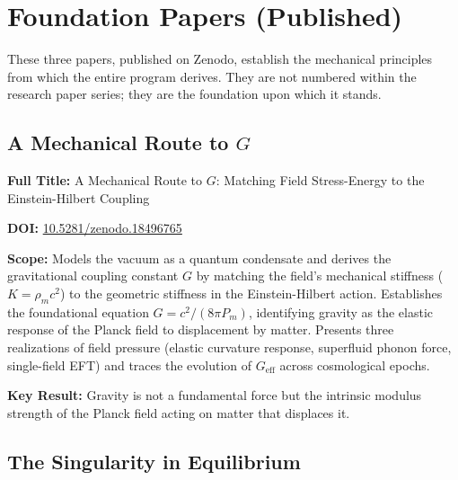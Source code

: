 \documentclass[11pt,a4paper]{article}
\begin{document}
\section{Foundation Papers (Published)}
\label{sec:foundation}

These three papers, published on Zenodo, establish the mechanical principles from which the entire program derives. They are not numbered within the research paper series; they are the foundation upon which it stands.

\subsection{A Mechanical Route to $G$}
\label{sec:foundation_G}

\textbf{Full Title:} A Mechanical Route to $G$: Matching Field Stress-Energy to the Einstein-Hilbert Coupling

\textbf{DOI:} \href{https://doi.org/10.5281/zenodo.18496765}{10.5281/zenodo.18496765}

\textbf{Scope:} Models the vacuum as a quantum condensate and derives the gravitational coupling constant $G$ by matching the field's mechanical stiffness ($K = \rho_m c^2$) to the geometric stiffness in the Einstein-Hilbert action. Establishes the foundational equation $G = c^2/(8\pi P_m)$, identifying gravity as the elastic response of the Planck field to displacement by matter. Presents three realizations of field pressure (elastic curvature response, superfluid phonon force, single-field EFT) and traces the evolution of $G_{\mathrm{eff}}$ across cosmological epochs.

\textbf{Key Result:} Gravity is not a fundamental force but the intrinsic modulus strength of the Planck field acting on matter that displaces it.

\subsection{The Singularity in Equilibrium}
\label{sec:foundation_singularity}
\end{document}
